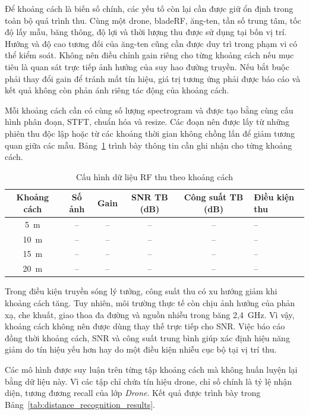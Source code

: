 \documentclass[../DoAn.tex]{subfiles}
\begin{document}
Để khoảng cách là biến số chính, các yếu tố còn lại cần được giữ ổn định trong toàn bộ quá trình thu. Cùng một drone, bladeRF, ăng-ten, tần số trung tâm, tốc độ lấy mẫu, băng thông, độ lợi và thời lượng thu được sử dụng tại bốn vị trí. Hướng và độ cao tương đối của ăng-ten cũng cần được duy trì trong phạm vi có thể kiểm soát. Không nên điều chỉnh gain riêng cho từng khoảng cách nếu mục tiêu là quan sát trực tiếp ảnh hưởng của suy hao đường truyền. Nếu bắt buộc phải thay đổi gain để tránh mất tín hiệu, giá trị tương ứng phải được báo cáo và kết quả không còn phản ánh riêng tác động của khoảng cách.

Mỗi khoảng cách cần có cùng số lượng spectrogram và được tạo bằng cùng cấu hình phân đoạn, STFT, chuẩn hóa và resize. Các đoạn nên được lấy từ những phiên thu độc lập hoặc từ các khoảng thời gian không chồng lấn để giảm tương quan giữa các mẫu. Bảng~\ref{tab:distance_capture_setup} trình bày thông tin cần ghi nhận cho từng khoảng cách.

\begin{table}[H]
    \centering
    \caption{Cấu hình dữ liệu RF thu theo khoảng cách}
    \label{tab:distance_capture_setup}
    \renewcommand{\arraystretch}{1.3}
    \begin{tabular}{|c|c|c|c|c|p{}|}
        \hline
        \textbf{Khoảng cách} & \textbf{Số ảnh} & \textbf{Gain} & \textbf{SNR TB (dB)} & \textbf{Công suất TB (dB)} & \textbf{Điều kiện thu} \\ \hline
        5~m & -- & -- & -- & -- & -- \\ \hline
        10~m & -- & -- & -- & -- & -- \\ \hline
        15~m & -- & -- & -- & -- & -- \\ \hline
        20~m & -- & -- & -- & -- & -- \\ \hline
    \end{tabular}
\end{table}

Trong điều kiện truyền sóng lý tưởng, công suất thu có xu hướng giảm khi khoảng cách tăng. Tuy nhiên, môi trường thực tế còn chịu ảnh hưởng của phản xạ, che khuất, giao thoa đa đường và nguồn nhiễu trong băng 2,4~GHz. Vì vậy, khoảng cách không nên được dùng thay thế trực tiếp cho SNR. Việc báo cáo đồng thời khoảng cách, SNR và công suất trung bình giúp xác định hiệu năng giảm do tín hiệu yếu hơn hay do một điều kiện nhiễu cục bộ tại vị trí thu.

Các mô hình được suy luận trên từng tập khoảng cách mà không huấn luyện lại bằng dữ liệu này. Vì các tập chỉ chứa tín hiệu drone, chỉ số chính là tỷ lệ nhận diện, tương đương recall của lớp \textit{Drone}. Kết quả được trình bày trong Bảng~\ref{tab:distance_recognition_results}.
\end{document}
